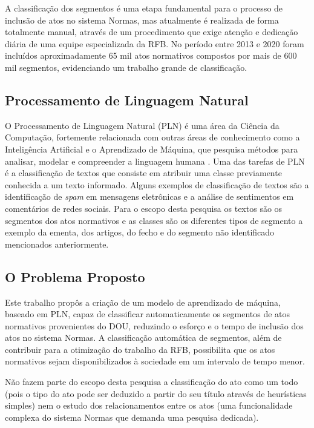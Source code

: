 A classificação dos segmentos é uma etapa fundamental para o processo de inclusão de atos no sistema Normas, mas atualmente é realizada de forma totalmente manual, através de um procedimento que exige atenção e dedicação diária de uma equipe especializada da RFB. No período entre 2013 e 2020 foram incluídos aproximadamente 65 mil atos normativos compostos por mais de 600 mil segmentos, evidenciando um trabalho grande de classificação.

\subsection{Processamento de Linguagem Natural}

O Processamento de Linguagem Natural (PLN) é uma área da Ciência da Computação, fortemente relacionada com outras áreas de conhecimento como a Inteligência Artificial e o Aprendizado de Máquina, que pesquisa métodos para analisar, modelar e compreender a linguagem humana \cite{PracticalNLP2020}. Uma das tarefas de PLN é a classificação de textos que consiste em atribuir uma classe previamente conhecida a um texto informado. Alguns exemplos de classificação de textos são a identificação de \textit{spam} em mensagens eletrônicas e a análise de sentimentos em comentários de redes sociais. Para o escopo desta pesquisa os textos são os segmentos dos atos normativos e as classes são os diferentes tipos de segmento a exemplo da ementa, dos artigos, do fecho e do segmento não identificado mencionados anteriormente. 

\subsection{O Problema Proposto}

Este trabalho propôs a criação de um modelo de aprendizado de máquina, baseado em PLN, capaz de classificar automaticamente os segmentos de atos normativos provenientes do DOU, reduzindo o esforço e o tempo de inclusão dos atos no sistema Normas. A classificação automática de segmentos, além de contribuir para a otimização do trabalho da RFB, possibilita que os atos normativos sejam disponibilizados à sociedade em um intervalo de tempo menor.

Não fazem parte do escopo desta pesquisa a classificação do ato como um todo (pois o tipo do ato pode ser deduzido a partir do seu título através de heurísticas simples) nem o estudo dos relacionamentos entre os atos (uma funcionalidade complexa do sistema Normas que demanda uma pesquisa dedicada).

